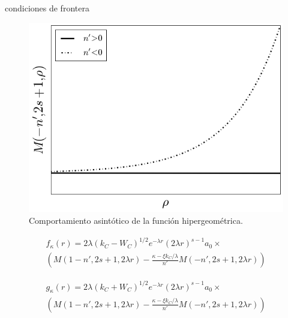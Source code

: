 \documentclass{beamer}
\begin{document}
\begin{frame}{condiciones de frontera}
\begin{figure}[H]
\centering
\includegraphics[scale=0.4]{../doc/hypgeo.png}
\caption*{Comportamiento asint\'otico de la funci\'on hipergeom\'etrica.}
\label{fig:hypgeo}
\end{figure}  
\end{frame}

\begin{frame}

\begin{equation}
\begin{split}
f_{\kappa}(r)=2\lambda (k_C -W_C)^{1/2}e^{-\lambda r}(2\lambda r)^{s-1}a_0 \times \\
\left( M(1-n',2s+1,2\lambda r) - \frac{\kappa-\xi k_C /\lambda}{n'} M(-n',2s+1,2\lambda r) \right)
\end{split}
\end{equation}

\begin{equation}
\begin{split}
g_{\kappa}(r)=2\lambda (k_C +W_C)^{1/2}e^{-\lambda r}(2\lambda r)^{s-1}a_0 \times \\
\left( M(1-n',2s+1,2\lambda r) - \frac{\kappa-\xi k_C /\lambda}{n'} M(-n',2s+1,2\lambda r) \right)
\end{split}
\end{equation}
\end{frame}
\end{document}
